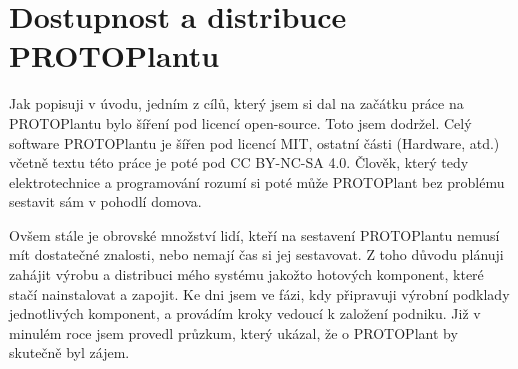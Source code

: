 \chapter{Dostupnost a distribuce PROTOPlantu}
Jak popisuji v úvodu, jedním z cílů, který jsem si dal na začátku práce na PROTOPlantu bylo šíření pod licencí open-source.
Toto jsem dodržel. 
Celý software PROTOPlantu je šířen pod licencí MIT, ostatní části (Hardware, atd.) včetně textu této práce je poté pod CC BY-NC-SA 4.0.
Člověk, který tedy elektrotechnice a programování rozumí si poté může PROTOPlant bez problému sestavit sám v pohodlí domova.

Ovšem stále je obrovské množství lidí, kteří na sestavení PROTOPlantu nemusí mít dostatečné znalosti, nebo nemají čas si jej sestavovat.
Z toho důvodu plánuji zahájit výrobu a distribuci mého systému jakožto hotových komponent, které stačí nainstalovat a zapojit.
Ke dni  jsem ve fázi, kdy připravuji výrobní podklady jednotlivých komponent, a provádím kroky vedoucí k založení podniku.
Již v minulém roce jsem provedl průzkum, který ukázal, že o PROTOPlant by skutečně byl zájem.

\newpage